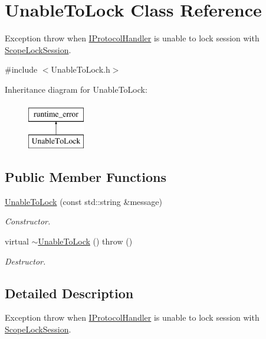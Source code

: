 \hypertarget{class_unable_to_lock}{\section{Unable\-To\-Lock Class Reference}
\label{class_unable_to_lock}
}


Exception throw when \hyperlink{class_i_protocol_handler}{I\-Protocol\-Handler} is unable to lock session with \hyperlink{class_scope_lock_session}{Scope\-Lock\-Session}.  




{\ttfamily \#include $<$Unable\-To\-Lock.\-h$>$}

Inheritance diagram for Unable\-To\-Lock\-:\begin{figure}[H]
\begin{center}
\leavevmode
\includegraphics[height=2.000000cm]{class_unable_to_lock}
\end{center}
\end{figure}
\subsection*{Public Member Functions}
\begin{DoxyCompactItemize}
\item 
\hyperlink{class_unable_to_lock_ae7c152096bea8512440332c1df377dfe}{Unable\-To\-Lock} (const std\-::string \&message)
\begin{DoxyCompactList}\small\item\em Constructor. \end{DoxyCompactList}\item 
\hypertarget{class_unable_to_lock_ae5aa5900f1f7b67535d892b42fd57426}{virtual \hyperlink{class_unable_to_lock_ae5aa5900f1f7b67535d892b42fd57426}{$\sim$\-Unable\-To\-Lock} ()  throw ()}\label{class_unable_to_lock_ae5aa5900f1f7b67535d892b42fd57426}

\begin{DoxyCompactList}\small\item\em Destructor. \end{DoxyCompactList}\end{DoxyCompactItemize}


\subsection{Detailed Description}
Exception throw when \hyperlink{class_i_protocol_handler}{I\-Protocol\-Handler} is unable to lock session with \hyperlink{class_scope_lock_session}{Scope\-Lock\-Session}. 

